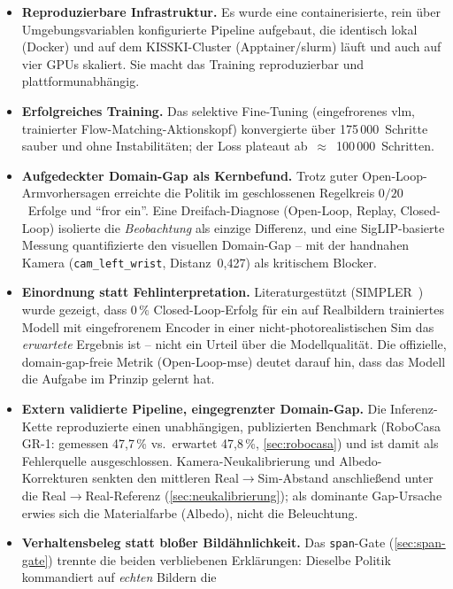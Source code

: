 \begin{itemize}
  \item \textbf{Reproduzierbare Infrastruktur.} Es wurde eine containerisierte,
    rein über Umgebungsvariablen konfigurierte Pipeline aufgebaut, die identisch
    lokal (Docker) und auf dem KISSKI-Cluster (Apptainer/\ac{slurm}) läuft und
    auch auf vier GPUs skaliert. Sie macht das Training reproduzierbar und
    plattformunabhängig.
  \item \textbf{Erfolgreiches Training.} Das selektive Fine-Tuning (eingefrorenes
    \ac{vlm}, trainierter Flow-Matching-Aktionskopf) konvergierte über
    175\,000~Schritte sauber und ohne Instabilitäten; der Loss plateaut
    ab~$\approx$~100\,000~Schritten.
  \item \textbf{Aufgedeckter Domain-Gap als Kernbefund.} Trotz guter Open-Loop-
    Armvorhersagen erreichte die Politik im geschlossenen Regelkreis
    $0/20$~Erfolge und \enquote{fror ein}. Eine Dreifach-Diagnose
    (Open-Loop, Replay, Closed-Loop) isolierte die \emph{Beobachtung} als
    einzige Differenz, und eine SigLIP-basierte Messung quantifizierte den
    visuellen Domain-Gap -- mit der handnahen Kamera
    (\texttt{cam\_left\_wrist}, Distanz~0,427) als kritischem Blocker.
  \item \textbf{Einordnung statt Fehlinterpretation.} Literaturgestützt
    (SIMPLER~\cite{simpler2024}) wurde gezeigt, dass $0\,\%$ Closed-Loop-Erfolg
    für ein auf Realbildern trainiertes Modell mit eingefrorenem Encoder in einer
    nicht-photorealistischen Sim das \emph{erwartete} Ergebnis ist -- nicht ein
    Urteil über die Modellqualität. Die offizielle, domain-gap-freie Metrik
    (Open-Loop-\ac{mse}) deutet darauf hin, dass das Modell die Aufgabe im Prinzip
    gelernt hat.
  \item \textbf{Extern validierte Pipeline, eingegrenzter Domain-Gap.} Die
    Inferenz-Kette reproduzierte einen unabhängigen, publizierten Benchmark
    (RoboCasa GR-1: gemessen 47,7\,\% vs.\ erwartet 47,8\,\%,
    \cref{sec:robocasa}) und ist damit als Fehlerquelle ausgeschlossen.
    Kamera-Neukalibrierung und Albedo-Korrekturen senkten den mittleren
    Real$\to$Sim-Abstand anschließend unter die Real$\to$Real-Referenz
    (\cref{sec:neukalibrierung}); als dominante Gap-Ursache erwies sich die
    Materialfarbe (Albedo), nicht die Beleuchtung.
  \item \textbf{Verhaltensbeleg statt bloßer Bildähnlichkeit.} Das
    \texttt{span}-Gate (\cref{sec:span-gate}) trennte die beiden verbliebenen
    Erklärungen: Dieselbe Politik kommandiert auf \emph{echten} Bildern die

\end{itemize}
